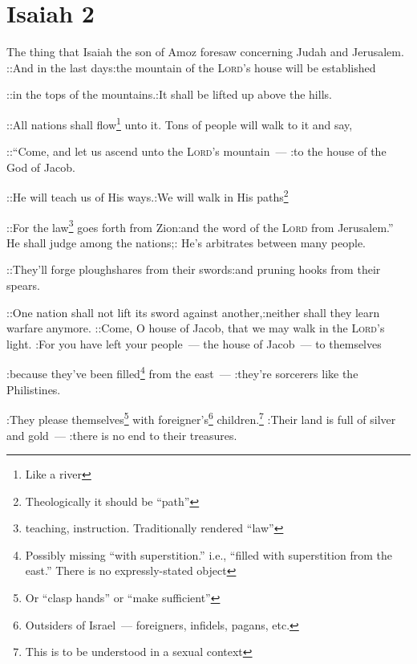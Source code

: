 \section{Isaiah 2}\label{Isaiah 2}
\begin{enumerate}
     The thing that Isaiah the son of Amoz foresaw concerning Judah and Jerusalem.%
     ::And in the last days:the mountain of the \textsc{Lord}'s house will be established%
    
    ::in the tops of the mountains.:It shall be lifted up above the hills.%
    
    ::All nations shall flow\footnote{Like a river} unto it. Tons of people will walk to it and say,%
    
    ::``Come, and let us ascend unto the \textsc{Lord}'s mountain~--- :to the house of the God of Jacob.%
    
    ::He will teach us of His ways.:We will walk in His paths\footnote{Theologically it should be ``path''}%
    
    ::For the law\footnote{teaching, instruction. Traditionally rendered ``law''} goes forth from Zion:and the word of the \textsc{Lord} from Jerusalem.''%
     He shall judge among the nations;: He's arbitrates between many people.%
    
    ::They'll forge ploughshares from their swords:and pruning hooks from their spears.%
    
    ::One nation shall not lift its sword against another,:neither shall they learn warfare anymore.%
     ::Come, O house of Jacob, that we may walk in the \textsc{Lord}'s light.%
     :For you have left your people~--- the house of Jacob~--- to themselves%
    
    :because they've been filled\footnote{Possibly missing ``with superstition.'' i.e., ``filled with superstition from the east.'' There is no expressly-stated object} from the east~--- :they're sorcerers like the Philistines.%
    
    :They please themselves\footnote{Or ``clasp hands'' or ``make sufficient''} with foreigner's\footnote{Outsiders of Israel~--- foreigners, infidels, pagans, etc.} children.\footnote{This is to be understood in a sexual context}%
     :Their land is full of silver and gold~--- :there is no end to their treasures.%
    

\end{enumerate}
